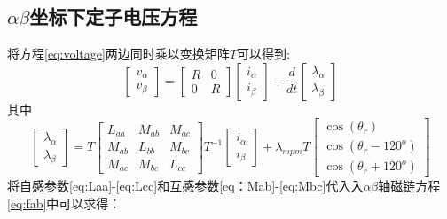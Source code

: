 \subsection{$\alpha\beta$坐标下定子电压方程}
将方程\ref{eq:voltage}两边同时乘以变换矩阵$T$可以得到:
\begin{equation}\label{eq:vab}
\begin{bmatrix}
v_{\alpha}\\v_{\beta}
\end{bmatrix}
=
\begin{bmatrix}
R&0\\0&R
\end{bmatrix}
\begin{bmatrix}
i_{\alpha}\\i_{\beta}
\end{bmatrix}
+
\frac{d}{dt}\begin{bmatrix}
\lambda_{\alpha}\\\lambda_{\beta}
\end{bmatrix}
\end{equation}
其中
\begin{equation}\label{eq:fab}
\begin{bmatrix}
\lambda_{\alpha}\\\lambda_{\beta}
\end{bmatrix}
=T\begin{bmatrix}
L_{aa}&M_{ab}&M_{ac}\\M_{ab}&L_{bb}&M_{bc}\\M_{ac}&M_{bc}&L_{cc}\end{bmatrix}T^{-1}\begin{bmatrix}
i_{\alpha}\\i_{\beta}
\end{bmatrix}
+
\lambda_{mpm}T\begin{bmatrix}\cos(\theta_{r})\\\cos(\theta_{r}-120^{o})\\\cos(\theta_{r}+120^{o})\end{bmatrix}
\end{equation}
将自感参数\ref{eq:Laa}-\ref{eq:Lcc}和互感参数\ref{eq：Mab}-\ref{eq:Mbc}代入入$\alpha\beta$轴磁链方程\ref{eq:fab}中可以求得：
